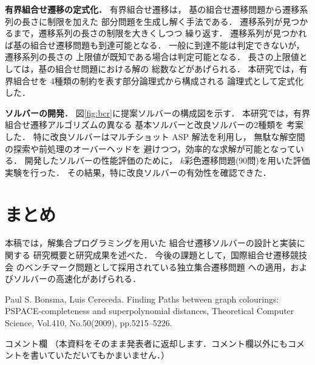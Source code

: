 \documentclass[a4j,10pt,dvipdfmx]{jarticle}
\begin{document}
\begin{multicols}{1}
\textbf{有界組合せ遷移の定式化．} 
有界組合せ遷移は，
基の組合せ遷移問題から遷移系列の長さに制限を加えた
部分問題を生成し解く手法である．
遷移系列が見つかるまで，遷移系列の長さの制限を大きくしつつ
繰り返す．
遷移系列が見つかれば基の組合せ遷移問題も到達可能となる．
一般に到達不能は判定できないが，遷移系列の長さの
上限値が既知である場合は判定可能となる．
長さの上限値としては，基の組合せ問題における解の
総数などがあげられる．
%
本研究では，有界組合せを
4種類の制約を表す部分論理式から構成される
論理式として定式化した．

\textbf{ソルバーの開発．}
図\ref{fig:bcr}に提案ソルバーの構成図を示す．
本研究では，有界組合せ遷移アルゴリズムの異なる
基本ソルバーと改良ソルバーの2種類を
考案した．
特に改良ソルバーはマルチショット ASP 解法を利用し，
無駄な解空間の探索や前処理のオーバーヘッドを
避けつつ，効率的な求解が可能となっている．
開発したソルバーの性能評価のために，
$k$彩色遷移問題(90問)を用いた評価実験を行った．
その結果，特に改良ソルバーの有効性を確認できた．

\section{まとめ}
本稿では，解集合プログラミングを用いた
組合せ遷移ソルバーの設計と実装に関する
研究概要と研究成果を述べた．
今後の課題として，国際組合せ遷移競技会
のベンチマーク問題として採用されている独立集合遷移問題
への適用，およびソルバーの高速化があげられる．


\begin{thebibliography}{10}

%
Paul S. Bonsma, Luis Cereceda.
Finding Paths between graph colourings: PSPACE-completeness and superpolynomial distances,
Theoretical Computer Science, Vol.410, No.50(2009), pp.5215--5226.

\end{thebibliography}

\end{multicols}
\vfill
\noindent
{\gt コメント欄}
{\footnotesize
（本資料をそのまま発表者に返却します．コメント欄以外にもコメントを書いていただいてもかまいません．）}
\\
\fbox{\begin{minipage}{\textwidth}\noindent\\\\\end{minipage}}	
\end{document}
